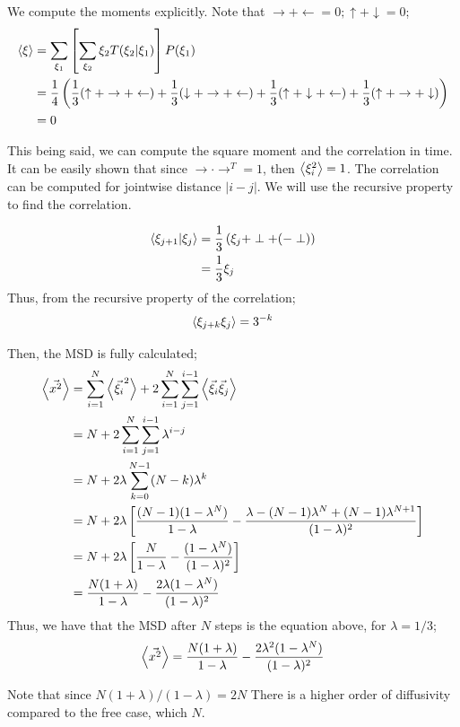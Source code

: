 \begin{solution}
	We compute the moments explicitly. Note that $\rightarrow + \leftarrow = 0 ; \uparrow + \downarrow = 0$;
	\begin{equation*}
		\begin{aligned}
			\left\langle{\xi}\right\rangle &= \sum_{\xi_1}\left[\sum_{\xi_2} \xi_2 T(\xi_2 | \xi_1)\right] P(\xi_1)\\&= \frac{1}{4}\left(\frac{1}{3}(\uparrow + \rightarrow + \leftarrow) + \frac{1}{3}(\downarrow + \rightarrow + \leftarrow) + \frac{1}{3}(\uparrow + \downarrow + \leftarrow) + \frac{1}{3}(\uparrow + \rightarrow + \downarrow)\right) \\
			&= 0 
		\end{aligned}
	\end{equation*}

	This being said, we can compute the square moment and the correlation in time. It can be easily shown that since $\rightarrow \cdot \rightarrow^T = 1$, then $\left\langle{\xi_i^2}\right\rangle = 1$. The correlation can be computed for jointwise distance $|i-j|$. We will use the recursive property to find the correlation.

	\begin{equation*}
		\begin{aligned}
			\left\langle{\xi_{j+1} | \xi_j}\right\rangle &= \frac{1}{3}\left(\xi_j + \perp + (- \perp)\right) \\
			&= \frac{1}{3}\xi_j
		\end{aligned}
	\end{equation*}
	Thus, from the recursive property of the correlation;
	\begin{equation}
		\left\langle{\xi_{j+k}\xi_j}\right\rangle = {3}^{-k}
	\end{equation}

	Then, the MSD is fully calculated;
	\begin{equation*}
		\begin{aligned}
			\left\langle{\vec{x^2}}\right\rangle &= \sum_{i=1}^N\left\langle{\vec{\xi_i}^2}\right\rangle + 2\sum_{i=1}^N \sum_{j=1}^{i-1} \left\langle{\vec \xi_i \vec \xi_j}\right\rangle\\
			 &= N + 2\sum_{i=1}^N \sum_{j=1}^{i-1} \lambda^{i-j}\\
			 &= N + 2\lambda\sum_{k=0}^{N-1} (N-k)\lambda^{k}\\
			 &= N + 2\lambda\left[\frac{(N-1)(1-\lambda^{N})}{1-\lambda} - \frac{\lambda -(N-1)\lambda^{N}+(N-1)\lambda^{N+1}}{(1-\lambda)^2}\right]\\
			&= N + 2\lambda\left[\frac{N}{1-\lambda} - \frac{(1-\lambda^N)}{(1-\lambda)^2}\right]\\
			&= \frac{N(1+\lambda)}{1-\lambda} - \frac{2\lambda(1-\lambda^N)}{(1-\lambda)^2}\\
		\end{aligned}
	\end{equation*}
	Thus, we have that the MSD after $N$ steps is the equation above, for $\lambda = 1/3$;
	\begin{equation}
		\left\langle{\vec{x^2}}\right\rangle = \frac{N(1+\lambda)}{1-\lambda} - \frac{2\lambda^2(1-\lambda^N)}{(1-\lambda)^2}
	\end{equation}

	Note that since $N(1+\lambda)/(1-\lambda) = 2N$ There is a higher order of diffusivity compared to the free case, which $N$.


\end{solution}